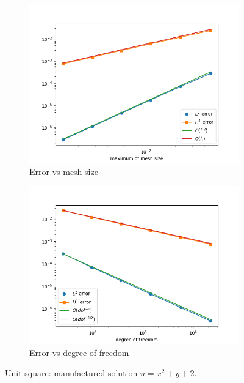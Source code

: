 \documentclass[12pt]{article}%
\theoremstyle{plain}
\numberwithin{equation}{section}
\begin{document}
 \begin{figure}[H]%
    \centering
         \begin{subfigure}[h]{0.45\linewidth}
          \caption{Error vs mesh size}
\includegraphics[width=\linewidth]{figures/Ex3/Ex3_test_2.png}
\end{subfigure}
  \begin{subfigure}[h]{0.45\linewidth}
   \caption{Error vs degree of freedom}
\includegraphics[width=\linewidth]{figures/Ex3/Ex3_test_2_dof.png}
\end{subfigure}
  \caption{Unit square: manufactured solution $u=x^2+y+2$.}
  \label{fig:Ex3_test_2}
 \end{figure}
 
\end{document}
